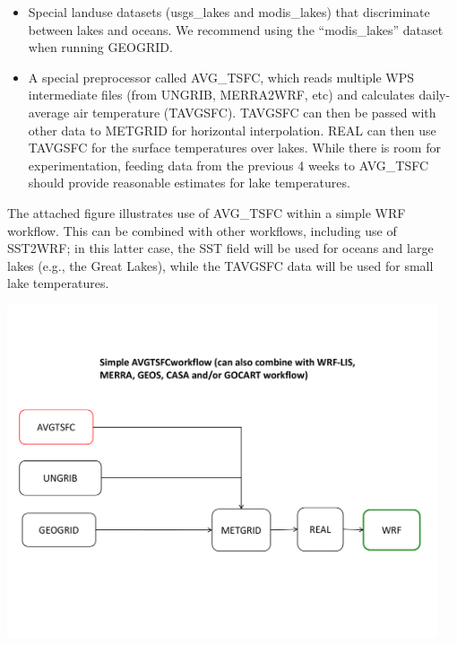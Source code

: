 \begin{itemize}

\item Special landuse datasets (usgs\_lakes and modis\_lakes) that 
discriminate between lakes and oceans.  We recommend using the ``modis\_lakes''
dataset when running GEOGRID.

\item A special preprocessor called AVG\_TSFC, which reads multiple WPS 
intermediate files (from UNGRIB, MERRA2WRF, etc) and calculates daily-average
air temperature (TAVGSFC).  TAVGSFC can then be passed with other data to 
METGRID for horizontal interpolation.  REAL can then use TAVGSFC for the 
surface temperatures over lakes.  While there is room for experimentation, 
feeding data from the previous 4 weeks to AVG\_TSFC should provide reasonable 
estimates for lake temperatures.

\end{itemize}

The attached figure illustrates use of AVG\_TSFC within a simple WRF workflow.
This can be combined with other workflows, including use of SST2WRF; in this 
latter case, the SST field will be used for oceans and large lakes (e.g., the 
Great Lakes), while the TAVGSFC data will be used for small lake temperatures.

\centerline{\includegraphics[width=5in]{AVG_TSFC_workflow}}



